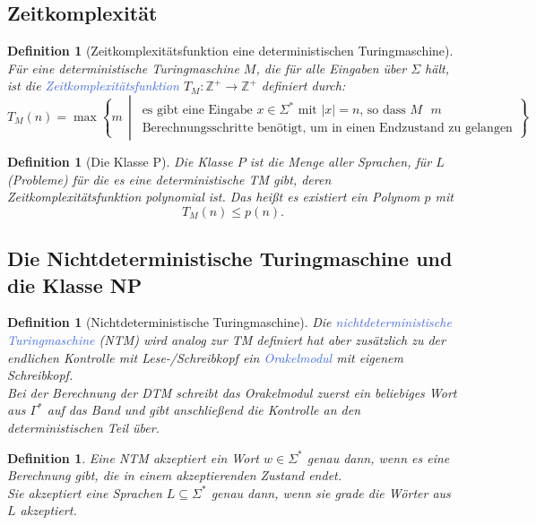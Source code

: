 \documentclass[11pt]{article}
\newcommand{\tcol}[1]{\textcolor{RoyalBlue}{#1}}
\newcommand{\set}[1]{\left\lbrace #1\right\rbrace}
\theoremstyle{break}
\newtheorem{defi}[satz]{Definition}
\begin{document}
\subsection{Zeitkomplexität}

\begin{defi}[Zeitkomplexitätsfunktion eine deterministischen Turingmaschine]
Für eine deterministische Turingmaschine $M$, die für alle Eingaben über $\Sigma$ hält, ist die \tcol{Zeitkomplexitätsfunktion} $T_M\colon\mathbb{Z}^+\to\mathbb{Z}^+$ definiert durch:
\[
T_M(n)=\max\set{m\,\middle|\,
\begin{array}{c}
\text{es gibt eine Eingabe $x\in\Sigma^*$ mit $|x|=n$, so dass $M$ $m$}\\
\text{Berechnungsschritte benötigt, um in einen Endzustand zu gelangen}
\end{array}}
\]
\end{defi}

\begin{defi}[Die Klasse P]
Die Klasse $P$ ist die Menge aller Sprachen, für $L$ (Probleme) für die es eine deterministische TM gibt, deren Zeitkomplexitätsfunktion polynomial ist. Das heißt es existiert ein Polynom $p$ mit
\[T_M(n)\leq p(n).\]
\end{defi}


\subsection{Die Nichtdeterministische Turingmaschine und die Klasse NP}

\begin{defi}[Nichtdeterministische Turingmaschine]
Die \tcol{nichtdeterministische Turingmaschine} (NTM) wird analog zur TM definiert hat aber zusätzlich zu der endlichen Kontrolle mit Lese-/Schreibkopf ein \tcol{Orakelmodul} mit eigenem Schreibkopf.\\
Bei der Berechnung der DTM schreibt das Orakelmodul zuerst ein beliebiges Wort aus $\Gamma^*$ auf das Band und gibt anschließend die Kontrolle an den deterministischen Teil über.
\end{defi}

\begin{defi}
Eine NTM akzeptiert ein Wort $w\in\Sigma^*$ genau dann, wenn es eine Berechnung gibt, die in einem akzeptierenden Zustand endet.\\
Sie akzeptiert eine Sprachen $L\subseteq\Sigma^*$ genau dann, wenn sie grade die Wörter aus $L$ akzeptiert.
\end{defi}
\end{document}
